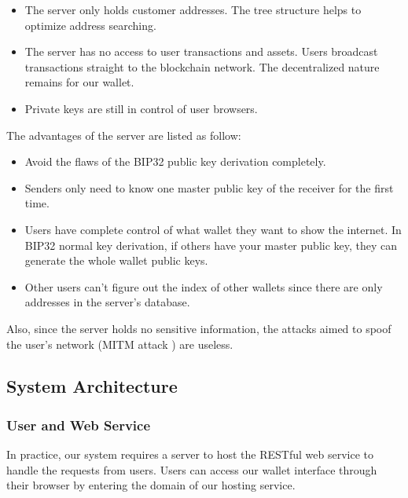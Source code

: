 \begin{adjustwidth}{1cm}{}
    \begin{itemize}
        \item The server only holds customer addresses. The tree structure helps to optimize address searching.
        \item The server has no access to user transactions and assets. Users broadcast transactions straight to the blockchain network. The decentralized nature remains for our wallet.
        \item Private keys are still in control of user browsers.
    \end{itemize}

    The advantages of the server are listed as follow:

    \begin{itemize}
        \item Avoid the flaws of the BIP32 public key derivation completely.
        \item Senders only need to know one master public key of the receiver for the first time.
        \item Users have complete control of what wallet they want to show the internet. In BIP32 normal key derivation, if others have your master public key, they can generate the whole wallet public keys.
        \item Other users can't figure out the index of other wallets since there are only addresses in the server's database.
    \end{itemize}

    Also, since the server holds no sensitive information, the attacks aimed to spoof the user’s network (MITM attack \cite{mitm}) are useless.

\end{adjustwidth}



\subsection{System Architecture}
\label{system_architect}

\subsubsection{User and Web Service}

In practice, our system requires a server to host the RESTful web service to handle the requests from users. Users can access our wallet interface through their browser by entering the domain of our hosting service.

